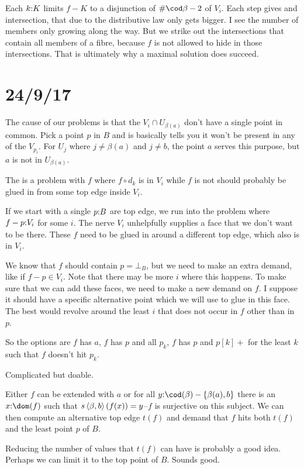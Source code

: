 \documentclass[csh.tex]{subfiles}
\begin{document}
Each $k\mathord : K$ limits $f-K$ to a disjunction of $\#\cod\beta - 2$ of $V_i$. Each step gives and intersection, that due to the distributive law only gets bigger. I see the number of members only growing along the way. But we strike out the intersections that contain all members of a fibre, because $f$ is not allowed to hide in those intersections. That is ultimately why a maximal solution does succeed. 

\section{24/9/17}

The cause of our problems is that the $V_i\cap U_{\beta(a)}$ don't have a single point in common. Pick a point $p$ in $B$ and is basically tells you it won't be present in any of the $V_{p_i}$.
For $U_j$ where $j\neq \beta(a)$ and $j\neq b$, the point $a$ serves this purpose, but $a$ is not in $U_{\beta(a)}$.

The is a problem with $f$ where $f\circ d_k$ is in $V_i$ while $f$ is not should probably be glued in from some top edge inside $V_i$. 

If we start with a single $p\mathord : B$ are top edge, we run into the problem where $f - p\mathord : V_i$ for some $i$. The nerve $V_i$ unhelpfully supplies a face that we don't want to be there.
These $f$ need to be glued in around a different top edge, which also is in $V_i$.

We know that $f$ should contain $p = \bot_B$, but we need to make an extra demand, like if $f-p\in V_i$. Note that there may be more $i$ where this happens.
To make sure that we can add these faces, we need to make a new demand on $f$. I suppose it should have a specific alternative point which we will use to glue in this face.
The best would revolve around the least $i$ that does not occur in $f$
other than in $p$. 

So the options are $f$ has $a$, $f$ has $p$ and all $p_k$, $f$ has $p$ and $p[k]+$ for the least $k$ such that $f$ doesn't hit $p_k$.

Complicated but doable.

Either $f$ can be extended with $a$ or for all $y\of \cod(\beta)-\set{\beta(a),b}$ there is an $x\of \dom(f)$ such that $s\left\langle \beta,b \right\rangle(f(x)) = y$--$f$ is surjective on this subject. We can then compute an alternative top edge $t(f)$ and demand that $f$ hits both $t(f)$ and the least point $p$ of $B$.

Reducing the number of values that $t(f)$ can have is probably a good idea. Perhaps we can limit it to the top point of $B$.
Sounds good.
\end{document}
